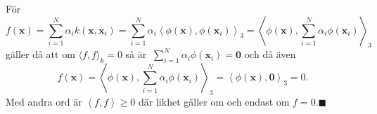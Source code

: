 \documentclass[a4paper, 12pt]{report}
\theoremstyle{definition}
\theoremstyle{remark}
\renewcommand\qedsymbol{$\blacksquare$}
\newcommand{\bfx}{\mathbf{x}}
\begin{document}
\begin{enumerate}
	För
	\begin{equation*}
		f\left(\bfx\right)=\sum_{i=1}^{N}\alpha_i k\left(\bfx, \bfx_i\right) = \sum_{i=1}^{N}\alpha_i \left\langle\phi\left(\bfx\right), \phi\left(\bfx_i\right) \right\rangle_3 = \left\langle \phi\left(\bfx\right), \sum_{i=1}^{N}\alpha_i\phi\left(\bfx_i\right) \right\rangle_3
	\end{equation*}
	gäller då att om $\langle f, f \rangle_k = 0$ så är $\ \sum_{i=1}^{N}\alpha_i\phi\left(\bfx_i\right)=\mathbf{0}$ och då även
	\begin{equation*}
		f\left(\bfx\right) = \left\langle \phi\left(\bfx\right), \sum_{i=1}^{N}\alpha_i\phi\left(\bfx_i\right) \right\rangle_3 = \left\langle \phi\left(\bfx\right), \mathbf{0}\right\rangle_3=0.
	\end{equation*}
	Med andra ord är $\left\langle f,f\right\rangle\geq0$ där likhet gäller om och endast om $f=0$.\hfill\qedsymbol
	

\end{enumerate}
\end{document}
